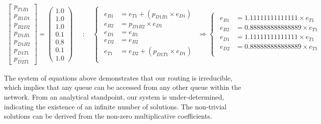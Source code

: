 \[
	\begin{array}{c}
	\begin{bmatrix}
	p_{T1B1} \\
	p_{B1D1} \\
	p_{B2D2} \\
	p_{D1B1} \\
	p_{D1B2} \\
	p_{D1T1} \\
	p_{D2T1}
	\end{bmatrix}
	=
	\begin{pmatrix}
	1.0 \\
	1.0 \\
	1.0 \\
	0.1 \\
	0.8 \\
	0.1 \\
	1.0
	\end{pmatrix}
	\end{array}
	\quad : \quad
	\begin{cases}
	\begin{aligned}
	e_{B1} &= e_{T1} + (p_{D1B1} \times e_{D1}) \\
	e_{B2} &= p_{D1B2} \times e_{D1} \\
	e_{D1} &= e_{B1} \\
	e_{D2} &= e_{B2} \\
	e_{T1} &= e_{D2} + (p_{D1T1} \times e_{D1}) \\
	\end{aligned}
	\end{cases}
	\Rightarrow
	\begin{cases}
	\begin{aligned}
	e_{B1} &= \num[round-mode=places, round-precision=4]{1.11111111111111} \times e_{T1}  \\
	e_{B2} &= \num[round-mode=places, round-precision=4]{0.888888888888889} \times e_{T1}  \\
	e_{D1} &= \num[round-mode=places, round-precision=4]{1.11111111111111} \times e_{T1}  \\
	e_{D2} &= \num[round-mode=places, round-precision=4]{0.888888888888889} \times e_{T1}  \\
	\end{aligned}
	\end{cases}
\]

The system of equations above demonstrates that our routing is irreducible, which implies that any queue can be accessed from any other queue within the network.
From an analytical standpoint, our system is under-determined, indicating the existence of an infinite number of solutions. The non-trivial solutions can be derived from the non-zero multiplicative coefficients.

